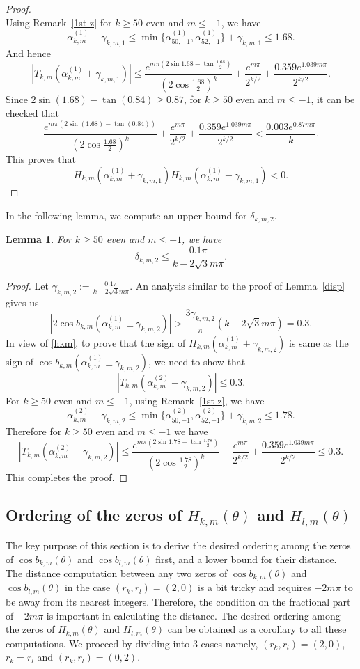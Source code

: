 \documentclass[12pt,reqno]{amsart}
\newtheorem{lem}{Lemma}
\newcommand{\lemref}[1]{Lemma~\ref{#1}}
\newcommand{\rmkref}[1]{Remark~\ref{#1}}
\begin{document}
\begin{proof}
$$$$
Using \rmkref{1st z} for $k\ge 50$ even and $m\le -1$, we have
$$
\alpha_{k,m}^{(1)}+\gamma_{k,m,1}\le \min\{\alpha_{50,-1}^{(1)},\alpha_{52,-1}^{(1)}\}+\gamma_{k,m,1}\le 1.68.
$$
And hence 
$$
|T_{k,m}(\alpha_{k,m}^{(1)}\pm\gamma_{k,m,1})|\le 
\frac{e^{m\pi(2\sin1.68-\tan\frac {1.68}{2})}}{(2\cos\frac {1.68}{2})^k}+\frac{e^{m\pi}}{2^{k/2}}+
\frac{0.359e^{1.039m\pi}}{2^{k/2}}.
$$
Since $2\sin(1.68)-\tan {(0.84)}\ge 0.87$, for $k\ge 50$ even and $m\le -1$, it can be checked that 
$$
\frac{e^{m\pi(2\sin(1.68)-\tan (0.84))}}{(2\cos\frac {1.68}{2})^k}+\frac{e^{m\pi}}{2^{k/2}}+
\frac{0.359e^{1.039m\pi}}{2^{k/2}}<\frac{0.003e^{0.87m\pi}}{k}.
$$
This proves that
$$
H_{k,m}(\alpha_{k,m}^{(1)}+\gamma_{k,m,1})H_{k,m}(\alpha_{k,m}^{(1)}-\gamma_{k,m,1})<0.
$$
\end{proof}
In the following lemma, we compute an upper bound for $\delta_{k,m,2}$.
\begin{lem}\label{disp2}
For $k\ge 50$ even and $m\le -1$, we have 
$$
\delta_{k,m,2}\le\frac{0.1\pi}{k-2\sqrt3m\pi}.
$$
\end{lem}
\begin{proof}
Let $\gamma_{k,m,2}:=\frac{0.1\pi}{k-2\sqrt3m\pi}$. An analysis similar to the proof of \lemref{disp}
gives us
$$
|2\cos b_{k,m}(\alpha_{k,m}^{(1)}\pm\gamma_{k,m,2})|>\frac{3\gamma_{k,m,2}}{\pi}(k-2\sqrt 3m\pi)={0.3}.
$$
In view of \eqref{hkm}, to prove that the sign of $H_{k,m}(\alpha_{k,m}^{(1)}\pm\gamma_{k,m,2})$ is same as the sign of $\cos b_{k,m}(\alpha_{k,m}^{(1)}\pm\gamma_{k,m,2})$, we need to show that
$$
|T_{k,m}(\alpha_{k,m}^{(2)}\pm\gamma_{k,m,2})|\le{0.3}.
$$
For $k\ge 50$ even and $m\le -1$, using \rmkref{1st z}, we have
$$
\alpha_{k,m}^{(2)}+\gamma_{k,m,2}\le \min\{\alpha_{50,-1}^{(2)},\alpha_{52,-1}^{(2)}\}+\gamma_{k,m,2}\le 1.78.
$$
Therefore for $k\ge 50$ even and $m\le -1$ we have 
$$
|T_{k,m}(\alpha_{k,m}^{(2)}\pm\gamma_{k,m,2})|\le 
\frac{e^{m\pi(2\sin1.78-\tan\frac {1.78}{2})}}{(2\cos\frac {1.78}{2})^k}+\frac{e^{m\pi}}{2^{k/2}}+
\frac{0.359e^{1.039m\pi}}{2^{k/2}}\le 0.3.
$$
This completes the proof.
\end{proof}



\subsection{Ordering of the zeros of $H_{k,m}(\theta)$ and $H_{l,m}(\theta)$}
The key purpose of this section
is to derive the desired ordering 
among the zeros of $\cos b_{k,m}(\theta)$ and $\cos b_{l,m}(\theta)$ first, and a lower bound for their distance. The distance computation between any two zeros of $\cos b_{k,m}(\theta)$ and $\cos b_{l,m}(\theta)$ in the case $(r_k,r_l)=(2,0)$ is a bit tricky and requires  $-2m\pi$ to be away from its nearest integers. Therefore, the condition 
on the fractional part of $-2m\pi$ is important in calculating the distance.
The desired ordering among the zeros of $H_{k,m}(\theta)$ and 
$H_{l,m}(\theta)$ can be obtained as a corollary to all these computations. We proceed by dividing into $3$ cases namely, $(r_k,r_l)=(2,0)$, $r_k=r_l$ and $(r_k,r_l)=(0,2)$.
\end{document}
